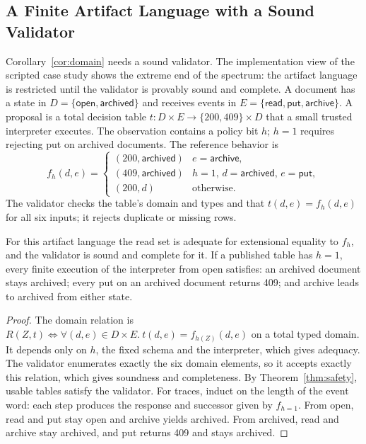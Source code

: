 \subsection{A Finite Artifact Language with a Sound Validator}\label{sec:discharged}
Corollary~\ref{cor:domain} needs a sound validator. The implementation view of the scripted case study shows the extreme end of the spectrum: the artifact language is restricted until the validator is provably sound and complete. A document has a state in $D=\{\mathsf{open},\mathsf{archived}\}$ and receives events in $E=\{\mathsf{read},\mathsf{put},\mathsf{archive}\}$. A proposal is a total decision table $t:D\times E\to\{200,409\}\times D$ that a small trusted interpreter executes. The observation contains a policy bit $h$; $h=1$ requires rejecting \textsf{put} on archived documents. The reference behavior is
\begin{equation}\label{eq:reference}
f_h(d,e)=\begin{cases}
(200,\mathsf{archived}) & e=\mathsf{archive},\\
(409,\mathsf{archived}) & h=1,\,d=\mathsf{archived},\,e=\mathsf{put},\\
(200,d) & \text{otherwise}.
\end{cases}
\end{equation}
The validator checks the table's domain and types and that $t(d,e)=f_h(d,e)$ for all six inputs; it rejects duplicate or missing rows.

\begin{theorem}\label{thm:table}
For this artifact language the read set is adequate for extensional equality to $f_h$, and the validator is sound and complete for it. If a published table has $h=1$, every finite execution of the interpreter from \textsf{open} satisfies: an archived document stays archived; every \textsf{put} on an archived document returns 409; and \textsf{archive} leads to \textsf{archived} from either state.
\end{theorem}
\begin{proof}
The domain relation is $R(Z,t)\iff\forall(d,e)\in D\times E.\ t(d,e)=f_{h(Z)}(d,e)$ on a total typed domain. It depends only on $h$, the fixed schema and the interpreter, which gives adequacy. The validator enumerates exactly the six domain elements, so it accepts exactly this relation, which gives soundness and completeness. By Theorem~\ref{thm:safety}, usable tables satisfy the validator. For traces, induct on the length of the event word: each step produces the response and successor given by $f_{h=1}$. From \textsf{open}, \textsf{read} and \textsf{put} stay \textsf{open} and \textsf{archive} yields \textsf{archived}. From \textsf{archived}, \textsf{read} and \textsf{archive} stay \textsf{archived}, and \textsf{put} returns 409 and stays \textsf{archived}.
\end{proof}

